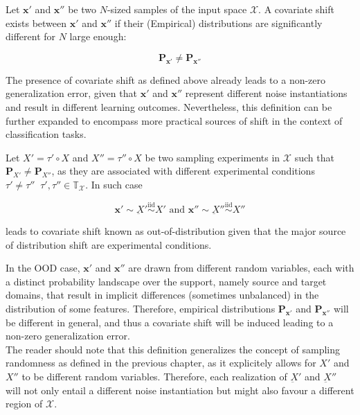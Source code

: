\begin{definition}
    Let $\bm{x}'$ and $\bm{x}''$ be two $N$-sized samples of the 
    input space $\mathcal{X}$.
    A covariate shift exists between $\bm{x}'$ and $\bm{x}''$ if their
    (Empirical) distributions are significantly different for $N$ large enough:

    $$
    \mathbf{P}_{\bm{x}'} \neq \mathbf{P}_{\bm{x}''}
    $$
\end{definition}

The presence of covariate shift as defined above already leads
to a non-zero generalization error, given that $\bm{x}'$ and $\bm{x}''$ 
represent different noise instantiations and result in different 
learning outcomes. Nevertheless, this definition can be further
expanded to encompass more practical sources of shift in the 
context of classification tasks.

\begin{definition}
    Let $X' = \tau' \circ X$ and $X'' = \tau'' \circ X$ be two sampling 
    experiments in $\mathcal{X}$ such that $\mathbf{P}_{X'} \neq \mathbf{P}_{X''}$, 
    as they are associated with different experimental
    conditions $\tau' \neq \tau'' \;\; \tau', \tau'' \in \mathbb{T}_{\mathcal{X}}$. 
    In such case

    $$
        \bm{x}' \sim \underbar{X}' \overset{\text{iid}}{\sim} X' \text{ and } \bm{x}'' \sim \underbar{X}'' \overset{\text{iid}}{\sim} X''
    $$

    leads to covariate shift known as out-of-distribution given that 
    the major source of distribution shift are experimental conditions.
\end{definition}

In the OOD case, $\bm{x}'$ and $\bm{x}''$ are
drawn from different random variables, each with a distinct probability 
landscape over the support, namely source and target domains, that result 
in implicit differences (sometimes unbalanced) in the distribution of some features.
Therefore, empirical distributions $\mathbf{P}_{\bm{x}'}$ and $\mathbf{P}_{\bm{x}''}$ will
be different in general, and thus a covariate shift will be induced
leading to a non-zero generalization error. \\

The reader should note that this definition generalizes the
concept of sampling randomness as defined in the previous 
chapter, as it explicitely allows for $X'$ and $X''$ to be 
different random variables. Therefore, each realization of 
$\underbar{X}'$ and $\underbar{X}''$ will not only entail a 
different noise instantiation but might 
also favour a different region of $\mathcal{X}$.


